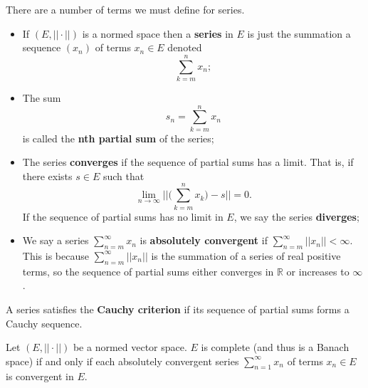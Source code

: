\begin{defn}
There are a number of terms we must define for series.
\begin{itemize}
\item If $(E, ||\cdot||)$ is a normed space then a \textbf{series} in $E$ is just the summation a sequence $(x_n)$ of terms $x_n \in E$ denoted \[\sum_{k=m}^{n}x_n;\]
\item The sum 
\[s_n = \sum_{k=m}^{n}x_n\]
is called the \textbf{nth partial sum} of the series;
\item The series \textbf{converges} if the sequence of partial sums has a limit.  That is, if there exists $s \in E$ such that
\[\lim_{n \to \infty} \biggl|\biggl|\biggl(\sum_{k=m}^{n}x_k\biggr) - s\biggr|\biggr| = 0.\]
If the sequence of partial sums has no limit in $E$, we say the series \textbf{diverges};
\item We say a series $\sum_{n=m}^\infty x_n$ is \textbf{absolutely convergent} if $\sum_{n=m}^\infty ||x_n|| < \infty$.  This is because $\sum_{n=m}^\infty ||x_n||$ is the summation of a series of real positive terms, so the sequence of partial sums either converges in $\mathbb{R}$ or increases to $\infty$.
\end{itemize}
\end{defn}

\begin{defn}
A series satisfies the \textbf{Cauchy criterion} if its sequence of partial sums forms a Cauchy sequence.
\end{defn}

\begin{theorem}
Let $(E, ||\cdot||)$ be a normed vector space.  $E$ is complete (and thus is a Banach space) if and only if each absolutely convergent series $\sum_{n=1}^\infty x_n$ of terms $x_n \in E$ is convergent in $E$.
\end{theorem}

